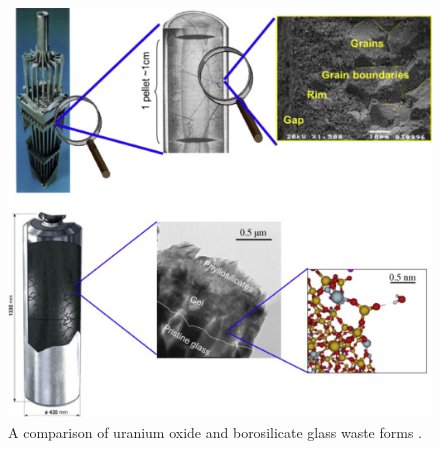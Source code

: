 \begin{figure}[htbp!]
  \begin{center}
    \includegraphics[width=0.7\textheight]{waste_forms_poinssot.eps}
  \end{center}
  \caption{A comparison of uranium oxide and borosilicate glass waste forms 
  \cite{poinssot_long-term_2012}.}
  \label{fig:waste_forms_poinssot}
\end{figure}
